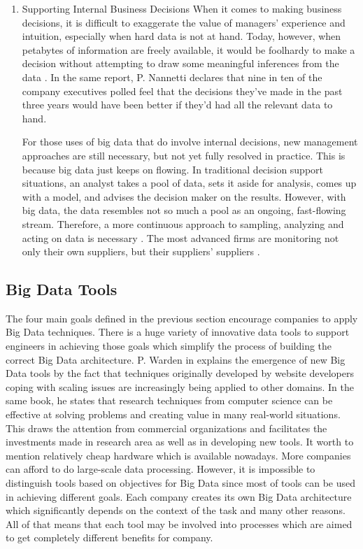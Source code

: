 \documentclass[runningheads]{llncs}
\begin{document}
\begin{enumerate}
\item Supporting Internal Business Decisions
When it comes to making business decisions, it is difficult to exaggerate the value of managers’ experience and intuition, especially when hard data is not at hand. Today, however, when petabytes of information
are freely available, it would be foolhardy to make a decision without attempting to draw some meaningful inferences from the data \cite{NANNETTI}. In the same report, P. Nannetti declares that nine in ten of the company executives polled feel that the decisions they’ve made in the past three years would have been better if they’d had all the relevant data to hand. 

For those uses of big data that do involve internal decisions, new management approaches are still necessary, but not yet fully resolved in practice. This is because big data just keeps on flowing. In traditional decision support situations, an analyst takes a pool of data, sets it aside for analysis, comes up with a model, and advises the decision maker on the results. However, with big data, the data resembles not so much a pool as an ongoing, fast-flowing stream. Therefore, a more continuous approach to sampling, analyzing and acting on data is necessary \cite{EMERALD}. The most advanced firms are monitoring not only their own suppliers, but their suppliers' suppliers \cite{DAVENPORT}. 

\end{enumerate}

\subsection{Big Data Tools}

The four main goals defined in the previous section encourage companies to apply Big Data techniques. There is a huge variety of innovative data tools to support engineers in achieving those goals which simplify the process of building the correct Big Data architecture. P. Warden in \cite{GLOSSARY} explains the emergence of new Big Data tools by the fact that techniques originally developed by website developers coping with scaling issues are increasingly being applied to other domains. In the same book, he states that research techniques from computer science can be effective at solving problems and creating value in many real-world situations. This draws the attention from commercial organizations and facilitates the investments made in research area as well as in developing new tools. It worth to mention relatively cheap hardware which is available nowadays. More companies can afford to do large-scale data processing. However, it is impossible to distinguish tools based on objectives for Big Data since most of tools can be used in achieving different goals. Each company creates its own Big Data architecture which significantly depends on the context of the task and many other reasons. All of that means that each tool may be involved into processes which are aimed to get completely different benefits for company.   
\end{document}
